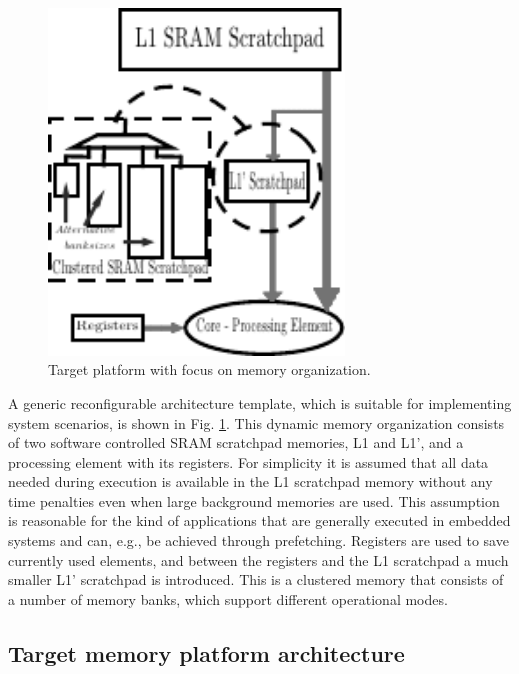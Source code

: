 \begin{figure}
	\centering
	\includegraphics[width=0.7\textwidth]{Images/platform.pdf}
	\caption{Target platform with focus on memory organization. }
	\label{fig:pltfrm}
\end{figure}

A generic reconfigurable architecture template, which is suitable for implementing system scenarios, is shown in Fig. \ref{fig:pltfrm}. 
This dynamic memory organization consists of two software controlled SRAM scratchpad memories, L1 and L1', and a processing element with its registers. 
For simplicity it is assumed that all data needed during execution is available in the L1 scratchpad memory without any time penalties even when large background memories are used. 
This assumption is reasonable for the kind of applications that are generally executed in embedded systems and can, e.g., be achieved through prefetching. 
Registers are used to save currently used elements, and between the registers and the L1 scratchpad a much smaller L1' scratchpad is introduced. 
This is a clustered memory that consists of a number of memory banks, which support different operational modes.

\subsection{Target memory platform architecture}


